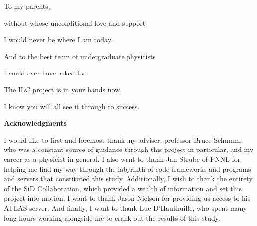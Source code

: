 \documentclass{report}
\begin{document}
    \tableofcontents


    \newpage \vspace*{\fill}
        \begin{center} \begin{large}
            To my parents, 
            
            without whose unconditional love and support
            
            I would never be where I am today.

            \vspace{40mm}

            And to the best team of undergraduate physicists
            
            I could ever have asked for.

            The ILC project is in your hands now.
            
            I know you will all see it through to success.
        \end{large} \end{center}
    \vspace*{\fill} \newpage \vspace*{\fill}
        \begin{center} \begin{large}
            \large \textbf{Acknowledgments} \vspace{\baselineskip}

            I would like to first and foremost thank my adviser, professor Bruce Schumm, who was a constant source of guidance through this project in particular, and my career as a physicist in general. I also want to thank Jan Strube of PNNL for helping me find my way through the labyrinth of code frameworks and programs and servers that constituted this study. Additionally, I wish to thank the entirety of the SiD Collaboration, which provided a wealth of information and set this project into motion. I want to thank Jason Nielson for providing us access to his ATLAS server. And finally, I want to thank Luc D'Hauthuille, who spent many long hours working alongside me to crank out the results of this study.
        \end{large} \end{center}
    \vspace*{\fill} \newpage
\end{document}
